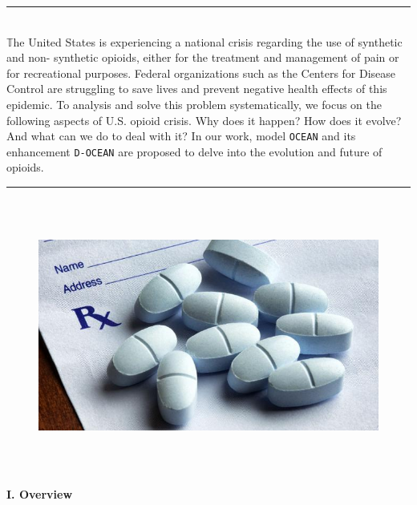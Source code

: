 \documentclass[a4paper]{article}
\newcommand{\HRule}{\rule{\linewidth}{0.5mm}}
\begin{document}
\noindent \HRule
\vspace{2.5mm} \\
\large{
\Large{$\mathbb{T}$}\large he United States is experiencing a national crisis regarding the use of synthetic and non- synthetic opioids, either for the treatment and management of pain or for recreational purposes. Federal organizations such as the Centers for Disease Control are struggling to save lives and prevent negative health effects of this epidemic. To analysis and solve this problem systematically, we focus on the following aspects of U.S. opioid crisis. Why does it happen? How does it evolve? And what can we do to deal with it? In our work, model \texttt{OCEAN} and its enhancement \texttt{D-OCEAN} are proposed to delve into the evolution and future of opioids.}
\vspace{2mm} \\
\HRule
\vspace{2cm}
\begin{figure}[h]
\centering
\includegraphics[width=17cm,height=9cm]{opioids_smartstock_istock_thinkstock2.jpeg}
\end{figure}
\clearpage
\vspace{6mm}
\begin{center}
\LARGE\textbf{I. Overview} \\
\end{center}
\vspace{2mm}
\end{document}
